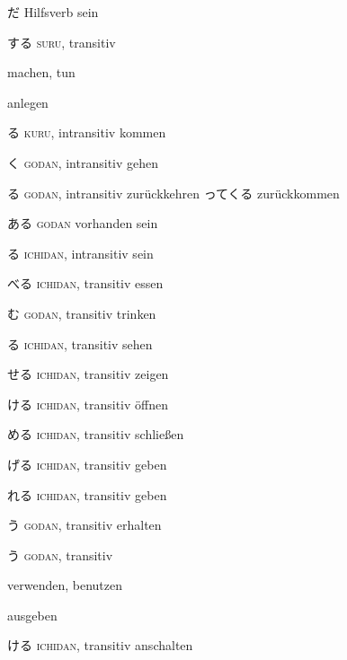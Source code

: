 \vocab
  {だ  }
  {Hilfsverb}
  {sein}
  {}

\vocab
  {する   }
  {\textsc{suru}, transitiv}
  {machen, tun
  \item anlegen }
  {}

\vocab
  {る  
  }
  {\textsc{kuru}, intransitiv}
  {kommen}
  {}

\vocab
  {く }
  {\textsc{godan}, intransitiv}
  {gehen}
  {}

\vocab
    {る}
    {\textsc{godan}, intransitiv}
    {zurückkehren}
    {\example
      {ってくる}
      {zurückkommen}
    }

\vocab
  {ある }
  {\textsc{godan}}
  {vorhanden sein}
  {}

\vocab
  {る}
  {\textsc{ichidan}, intransitiv}
  { sein}
  {}

\vocab
  {べる}
  {\textsc{ichidan}, transitiv}
  {essen}
  {}

\vocab
  {む}
  {\textsc{godan}, transitiv}
  {trinken}
  {}

\vocab
  {る}
  {\textsc{ichidan}, transitiv}
  {sehen}
  {}

\vocab
  {せる}
  {\textsc{ichidan}, transitiv}
  {zeigen}
  {}

\vocab
  {ける}
  {\textsc{ichidan}, transitiv}
  {öffnen}
  {}

\vocab
  {める}
  {\textsc{ichidan}, transitiv}
  {schließen}
  {}

\vocab
  {げる}
  {\textsc{ichidan}, transitiv}
  {geben }
  {}

\vocab
  {れる}
  {\textsc{ichidan}, transitiv}
  { geben }
  {}

\vocab
  {う}
  {\textsc{godan}, transitiv}
  { erhalten}
  {}

\vocab
  {う}
  {\textsc{godan}, transitiv}
  {verwenden, benutzen
  \item ausgeben }
  {}

\vocab
    {ける}
    {\textsc{ichidan}, transitiv}
    {anschalten}
    {}

